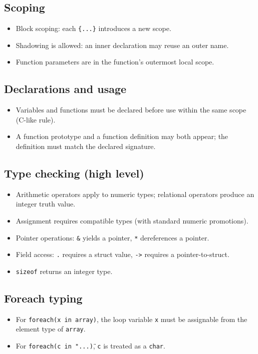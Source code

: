 \documentclass[11pt]{article}
\begin{document}
\subsection*{Scoping}
\begin{itemize}
	\item Block scoping: each \texttt{\{...\}} introduces a new scope.
	\item Shadowing is allowed: an inner declaration may reuse an outer name.
	\item Function parameters are in the function's outermost local scope.
\end{itemize}

\subsection*{Declarations and usage}
\begin{itemize}
	\item Variables and functions must be declared before use within the same scope (C-like rule).
	\item A function prototype and a function definition may both appear; the definition must match the declared signature.
\end{itemize}

\subsection*{Type checking (high level)}
\begin{itemize}
	\item Arithmetic operators apply to numeric types; relational operators produce an integer truth value.
	\item Assignment requires compatible types (with standard numeric promotions).
	\item Pointer operations: \texttt{\&} yields a pointer, \texttt{*} dereferences a pointer.
	\item Field access: \texttt{.} requires a struct value, \texttt{->} requires a pointer-to-struct.
	\item \texttt{sizeof} returns an integer type.
\end{itemize}

\subsection*{Foreach typing}
\begin{itemize}
	\item For \texttt{foreach(x in array)}, the loop variable \texttt{x} must be assignable from the element type of \texttt{array}.
	\item For \texttt{foreach(c in "...\")}, \texttt{c} is treated as a \texttt{char}.
\end{itemize}
\end{document}
